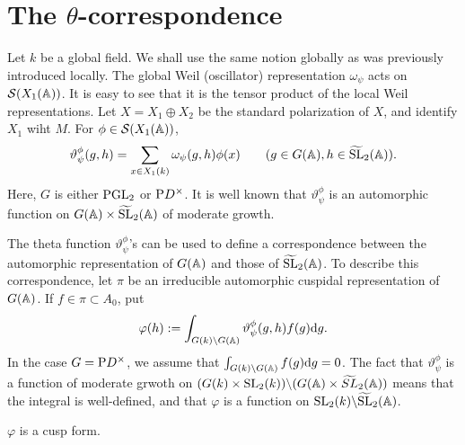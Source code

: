 \section{The $\theta$-correspondence}

Let $k$ be a global field.
We shall use the same notion globally as was previously introduced locally.
The global Weil (oscillator) representation $\omega_\psi$ acts on $\mathcal{S}(X_1(\mathbb{A}))$.
It is easy to see that it is the tensor product of the local Weil representations.
Let $X = X_1 \oplus X_2$ be the standard polarization of $X$, and identify $X_1$ wiht $M$.
For $\phi \in \mathcal{S}(X_1(\mathbb{A}))$,
\[
\vartheta_\psi^\phi(g, h) = \sum_{x \in X_1(k)} \omega_\psi(g, h) \phi(x)\qquad (g \in G(\mathbb{A}), h \in \widetilde{\mathrm{SL}}_2(\mathbb{A})).
\]
Here, $G$ is either $\mathrm{PGL}_2$ or $\mathrm{P} D^\times$.
It is well known that $\vartheta_\psi^\phi$ is an automorphic function on $G(\mathbb{A}) \times \widetilde{\mathrm{SL}}_2(\mathbb{A})$ of moderate growth.

The theta function $\vartheta_\psi^\phi$'s can be used to define a correspondence between the automorphic representation of $G(\mathbb{A})$ and those of $\widetilde{\mathrm{SL}}_2(\mathbb{A})$.
To describe this correspondence, let $\pi$ be an irreducible automorphic cuspidal representation of $G(\mathbb{A})$.
If $f \in \pi \subset A_0$, put
\[
\varphi(h) := \int_{G(k) \backslash G(\mathbb{A})} \vartheta_\psi^\phi(g, h) f(g) \mathrm{d} g.
\]
In the case $G = \mathrm{P} D^\times$, we assume that $\int_{G(k)\backslash G(\mathbb{A})} f(g) \mathrm{d} g = 0$.
The fact that $\vartheta_\psi^\phi$ is a function of moderate grwoth on $(G(k) \times \mathrm{SL}_2(k)) \backslash (G(\mathbb{A}) \times \widetilde{SL}_2(\mathbb{A}))$ means that the integral is well-defined, and that $\varphi$ is a function on $\mathrm{SL}_2(k) \backslash \widetilde{\mathrm{SL}}_2(\mathbb{A})$.

\begin{claim}
$\varphi$ is a cusp form.
\end{claim}

